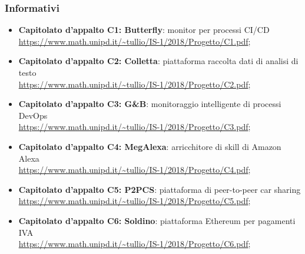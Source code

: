 \subsubsection{Informativi}
\begin{itemize}
	\item \textbf{Capitolato d'appalto C1: Butterfly}: monitor per processi CI/CD \\ \url{https://www.math.unipd.it/~tullio/IS-1/2018/Progetto/C1.pdf};
	
	\item \textbf{Capitolato d'appalto C2: Colletta}: piattaforma raccolta dati di analisi di testo\\
	\url{https://www.math.unipd.it/~tullio/IS-1/2018/Progetto/C2.pdf};
	
	\item \textbf{Capitolato d'appalto C3: G\&B}: monitoraggio intelligente di processi DevOps\\
	\url{https://www.math.unipd.it/~tullio/IS-1/2018/Progetto/C3.pdf};
	
	\item \textbf{Capitolato d'appalto C4: MegAlexa}: arricchitore di skill di Amazon Alexa\\
	\url{https://www.math.unipd.it/~tullio/IS-1/2018/Progetto/C4.pdf};
	
	\item \textbf{Capitolato d'appalto C5: P2PCS}: piattaforma di peer-to-peer car sharing\\
	\url{https://www.math.unipd.it/~tullio/IS-1/2018/Progetto/C5.pdf};
	
	\item \textbf{Capitolato d'appalto C6: Soldino}: piattaforma Ethereum per pagamenti IVA\\
	\url{https://www.math.unipd.it/~tullio/IS-1/2018/Progetto/C6.pdf};
\end{itemize}

	
	

